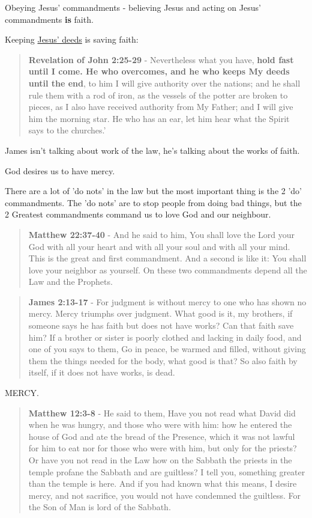 \documentclass[11pt]{article}
\begin{document}
Obeying Jesus' commandments - believing Jesus and acting on Jesus' commandments \textbf{is} faith.

Keeping \uline{Jesus' deeds} is saving faith:

\begin{quote}
\textbf{Revelation of John 2:25-29} - Nevertheless what you have, \textbf{hold fast until I come. He who overcomes, and he who keeps My deeds until the end}, to him I will give authority over the nations; and he shall rule them with a rod of iron, as the vessels of the potter are broken to pieces, as I also have received authority from My Father; and I will give him the morning star. He who has an ear, let him hear what the Spirit says to the churches.’
\end{quote}

James isn't talking about work of the law, he's talking about the works of faith.

God desires us to have mercy.

There are a lot of 'do nots' in the law but the most important thing is the 2 'do' commandments.
The 'do nots' are to stop people from doing bad things, but the 2 Greatest commandments command us to love God and our neighbour.

\begin{quote}
\textbf{Matthew 22:37-40} - And he said to him, You shall love the Lord your God with all your heart and with all your soul and with all your mind. This is the great and first commandment. And a second is like it: You shall love your neighbor as yourself. On these two commandments depend all the Law and the Prophets.
\end{quote}

\begin{quote}
\textbf{James 2:13-17} - For judgment is without mercy to one who has shown no mercy. Mercy triumphs over judgment. What good is it, my brothers, if someone says he has faith but does not have works? Can that faith save him? If a brother or sister is poorly clothed and lacking in daily food, and one of you says to them, Go in peace, be warmed and filled, without giving them the things needed for the body, what good is that? So also faith by itself, if it does not have works, is dead.
\end{quote}

MERCY.

\begin{quote}
\textbf{Matthew 12:3-8} - He said to them, Have you not read what David did when he was hungry, and those who were with him: how he entered the house of God and ate the bread of the Presence, which it was not lawful for him to eat nor for those who were with him, but only for the priests? Or have you not read in the Law how on the Sabbath the priests in the temple profane the Sabbath and are guiltless? I tell you, something greater than the temple is here. And if you had known what this means, I desire mercy, and not sacrifice, you would not have condemned the guiltless. For the Son of Man is lord of the Sabbath.
\end{quote}
\end{document}
